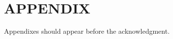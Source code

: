 \documentclass[letterpaper, 10 pt, conference]{ieeeconf}  %
\begin{document}
%
%

\addtolength{\textheight}{-12cm}   %







\section*{APPENDIX}

Appendixes should appear before the acknowledgment.
\end{document}
